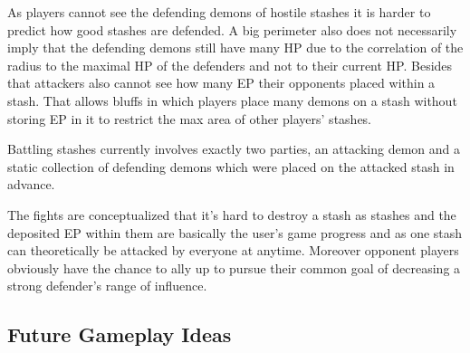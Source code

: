 As players cannot see the defending demons of hostile stashes it is harder to predict how good stashes are defended.
A big perimeter also does not necessarily imply that the defending demons still have many HP due to the correlation of the radius to the maximal HP of the defenders and not to their current HP.
Besides that attackers also cannot see how many EP their opponents placed within a stash.
That allows bluffs in which players place many demons on a stash without storing EP in it to restrict the max area of other players' stashes.



Battling stashes currently involves exactly two parties, an attacking demon and a static collection of defending demons which were placed on the attacked stash in advance.





The fights are conceptualized that it's hard to destroy a stash as stashes and the deposited EP within them are basically the user's game progress and as one stash can theoretically be attacked by everyone at anytime.
Moreover opponent players obviously have the chance to ally up to pursue their common goal of decreasing a strong defender's range of influence.



\subsection{Future Gameplay Ideas}
\label{subsec:futuregameplayideas}

